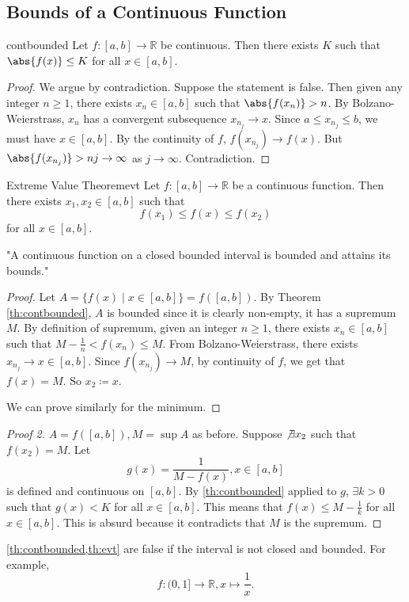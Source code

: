 \subsection{Bounds of a Continuous Function}
\leavevmode
\begin{theorem}{}{contbounded}
    Let \(f:[a,b] \to \mathbb{R}\) be continuous. Then there exists \(K\) such that \(\abs{f(x)} \leq K\) for all \(x \in [a,b]\).
\end{theorem}
\begin{proof}
    We argue by contradiction. Suppose the statement is false. Then given any integer \(n \geq 1\), there exists \(x_n \in [a,b]\) such that \(\abs{f(x_n)}  > n\). By Bolzano-Weierstrass, \(x_n\) has a convergent subsequence \(x_{n_j} \to x\). Since \(a \leq x_{n_j} \leq b\), we must have \(x \in [a,b]\). By the continuity of \(f\), \(f(x_{n_j}) \to f(x)\). But \(\abs{f(x_{n_j})} > nj \to \infty\) as \(j\to \infty\). Contradiction.
\end{proof}
\begin{theorem}{Extreme Value Theorem}{evt}
    Let \(f:[a,b] \to \mathbb{R}\) be a continuous function. Then there exists \(x_1, x_2 \in [a,b]\) such that
    \[
        f(x_1) \leq f(x) \leq f(x_2)
    \]
    for all \(x \in [a,b]\).
    
    "A continuous function on a closed bounded interval is bounded and attains its bounds."
\end{theorem}
\begin{proof}
    Let \(A = \{f(x)\mid x \in [a,b]\} = f([a,b])\). By Theorem \eqref{th:contbounded}, \(A\) is bounded since it is clearly non-empty, it has a supremum \(M\). By definition of supremum, given an integer \(n\geq 1\), there exists \(x_n \in [a,b]\) such that \(M-\frac{1}{n}<f(x_n) \leq M\). From Bolzano-Weierstrass, there exists \(x_{n_j} \to x \in [a,b]\). Since \(f(x_{n_j}) \to M\), by continuity of \(f\), we get that \(f(x) = M\). So \(x_2\coloneqq x\).

    We can prove similarly for the minimum.
\end{proof}
\begin{proof}[Proof 2]
    \(A = f([a,b]), M = \sup A\) as before. Suppose \(\not\exists x_2\) such that \(f(x_2) = M\). Let
    \[g(x) = \frac{1}{M - f(x)}, x \in [a,b]\]
    is defined and continuous on \([a,b]\). By \cref{th:contbounded} applied to \(g\), \(\exists k >0\) such that \(g(x) < K\) for all \(x \in [a,b]\). This means that \(f(x) \leq M - \frac{1}{k}\) for all \(x \in [a,b]\). This is absurd because it contradicts that \(M\) is the supremum.
\end{proof}
\begin{note}
    \cref{th:contbounded,th:evt} are false if the interval is not closed and bounded. For example,
    \[
        f: (0,1] \to \mathbb{R}, x \mapsto \frac{1}{x}.
    \]
\end{note}
